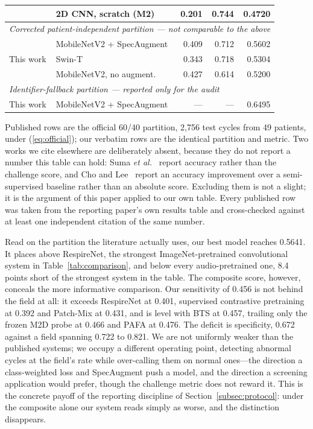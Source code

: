 \documentclass[journal,onecolumn]{IEEEtran}
\begin{document}
\begin{table}[!t]
\begin{tabular}{llrrr}
                           & 2D CNN, scratch (M2)      & 0.201 & 0.744 & 0.4720 \\
\midrule
\multicolumn{5}{l}{\emph{Corrected patient-independent partition --- not comparable to the above}}\\
\multirow{3}{*}{This work} & MobileNetV2 + SpecAugment & 0.409 & 0.712 & 0.5602 \\
                           & Swin-T                    & 0.343 & 0.718 & 0.5304 \\
                           & MobileNetV2, no augment.  & 0.427 & 0.614 & 0.5200 \\
\midrule
\multicolumn{5}{l}{\emph{Identifier-fallback partition --- reported only for the audit}}\\
This work & MobileNetV2 + SpecAugment & --- & --- & 0.6495 \\
\bottomrule
\end{tabular}

\vspace{2pt}
\footnotesize Published rows are the official 60/40 partition, 2{,}756 test cycles from
49 patients, under (\ref{eq:official}); our verbatim rows are the identical partition and
metric. Two works we cite elsewhere are deliberately absent, because they do not report a
number this table can hold: Suma \emph{et al.}~\cite{suma2025mtl} report accuracy rather
than the challenge score, and Cho and Lee~\cite{cho2025openset} report an accuracy
improvement over a semi-supervised baseline rather than an absolute score. Excluding them
is not a slight; it is the argument of this paper applied to our own table. Every
published row was taken from the reporting paper's own results table and cross-checked
against at least one independent citation of the same number.
\end{table}

Read on the partition the literature actually uses, our best model reaches 0.5641. It
places above RespireNet, the strongest ImageNet-pretrained convolutional system in
Table~\ref{tab:comparison}, and below every audio-pretrained one, 8.4 points short of the
strongest system in the table. The composite score, however, conceals the more informative
comparison. Our sensitivity of 0.456 is not behind the field at all: it exceeds RespireNet
at 0.401, supervised contrastive pretraining at 0.392 and Patch-Mix at 0.431, and is level
with BTS at 0.457, trailing only the frozen M2D probe at 0.466 and PAFA at 0.476. The
deficit is specificity, 0.672 against a field spanning 0.722 to 0.821. We are not uniformly
weaker than the published systems; we occupy a different operating point, detecting
abnormal cycles at the field's rate while over-calling them on normal ones---the direction
a class-weighted loss and SpecAugment push a model, and the direction a screening
application would prefer, though the challenge metric does not reward it. This is the
concrete payoff of the reporting discipline of Section~\ref{subsec:protocol}: under the
composite alone our system reads simply as worse, and the distinction disappears.
\end{document}

